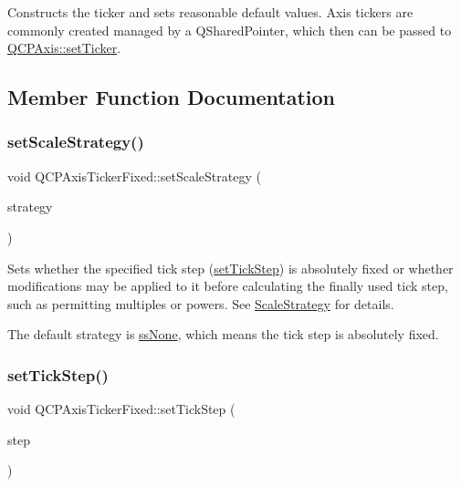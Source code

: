 Constructs the ticker and sets reasonable default values. Axis tickers are commonly created managed by a Q\+Shared\+Pointer, which then can be passed to \hyperlink{class_q_c_p_axis_a4ee03fcd2c74d05cd1a419b9af5cfbdc}{Q\+C\+P\+Axis\+::set\+Ticker}. 

\subsection{Member Function Documentation}
\mbox{\label{class_q_c_p_axis_ticker_fixed_acbc7c9bcd80b3dc3edee5f0519d301f6}} 
\subsubsection{\texorpdfstring{set\+Scale\+Strategy()}{setScaleStrategy()}}
{\footnotesize\ttfamily void Q\+C\+P\+Axis\+Ticker\+Fixed\+::set\+Scale\+Strategy (\begin{DoxyParamCaption}\item[{\hyperlink{class_q_c_p_axis_ticker_fixed_a15b3d38b935d404b1311eb85cfb6a439}{Q\+C\+P\+Axis\+Ticker\+Fixed\+::\+Scale\+Strategy}}]{strategy }\end{DoxyParamCaption})}

Sets whether the specified tick step (\hyperlink{class_q_c_p_axis_ticker_fixed_a4bc83d85a4f81d4abdd3fa5042d7b833}{set\+Tick\+Step}) is absolutely fixed or whether modifications may be applied to it before calculating the finally used tick step, such as permitting multiples or powers. See \hyperlink{class_q_c_p_axis_ticker_fixed_a15b3d38b935d404b1311eb85cfb6a439}{Scale\+Strategy} for details.

The default strategy is \hyperlink{class_q_c_p_axis_ticker_fixed_a15b3d38b935d404b1311eb85cfb6a439a5a515bf0c906eae47ef5d5e31eb9f818}{ss\+None}, which means the tick step is absolutely fixed. \mbox{\label{class_q_c_p_axis_ticker_fixed_a4bc83d85a4f81d4abdd3fa5042d7b833}} 
\subsubsection{\texorpdfstring{set\+Tick\+Step()}{setTickStep()}}
{\footnotesize\ttfamily void Q\+C\+P\+Axis\+Ticker\+Fixed\+::set\+Tick\+Step (\begin{DoxyParamCaption}\item[{double}]{step }\end{DoxyParamCaption})}

